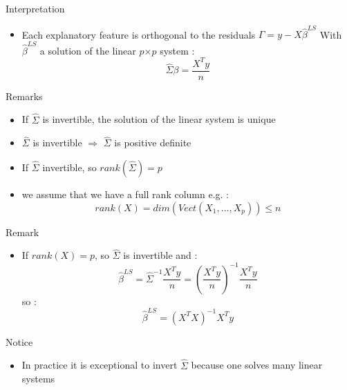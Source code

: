 \documentclass[unknownkeysallowed]{beamer}
\begin{document}
\begin{frame}

\begin{alertblock}{Interpretation}
    \begin{itemize}
        \item  Each explanatory feature is orthogonal to the residuals $\Gamma=y-X\hat{\beta}^{LS}$ With $\hat{\beta}^{LS}$ a solution of the linear $p$$\times$$p$ system : $$ \hat{\Sigma}\beta= \frac{X^T y}{n}  $$

    \end{itemize}


\end{alertblock}

\begin{block}{Remarks}
    \begin{itemize}
        \item  If $\hat{\Sigma}$ is invertible, the solution of the linear system is unique
        \item $\hat{\Sigma}$ is invertible $\Rightarrow$ $\hat{\Sigma}$ is positive definite
        \item If $\hat{\Sigma}$ invertible, so $rank(\hat{\Sigma})=p$
        \item we assume that we have a full rank column e.g. : $$rank(X)=dim(Vect(X_1,\dots,X_p)) \leq n $$

    \end{itemize}


\end{block}
\end{frame}



\begin{frame}



\begin{alertblock}{Remark}
    \begin{itemize}
        \item  If $rank(X)=p$, so $\hat{\Sigma}$ is invertible and : $$\hat{\beta}^{LS}=\hat{\Sigma}^{-1}\frac{X^T y}{n}=(\frac{X^T y}{n})^{-1} \frac{X^T y}{n}$$
       so :  $$ \hat{\beta}^{LS}=(X^TX)^{-1}X^Ty$$

    \end{itemize}


\end{alertblock}

\begin{block}{Notice}
    \begin{itemize}
        \item  In practice it is exceptional to invert $\hat{\Sigma} $ because one solves many linear systems

    \end{itemize}


\end{block}
\end{frame}
\end{document}
